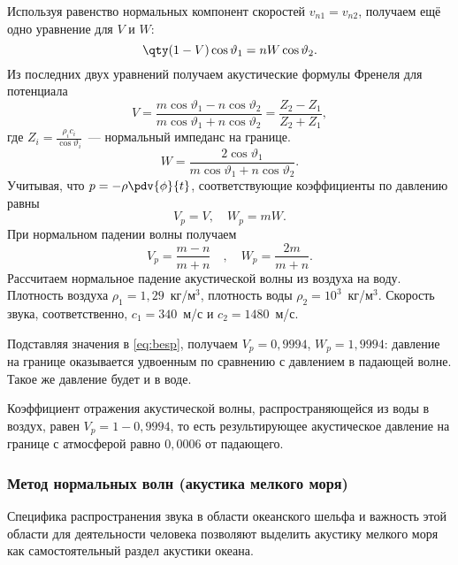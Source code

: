 Используя равенство нормальных компонент скоростей $v_{n1} = v_{n2}$, получаем ещё одно уравнение для $V$ и $W$:
\begin{equation}
\qty(1-V) \cos \vartheta_1 =nW \cos \vartheta_2.
\end{equation}
Из последних двух уравнений получаем акустические формулы Френеля для потенциала
\begin{equation}
V= \frac{m \cos \vartheta_1 -n \cos \vartheta_2 }{m \cos \vartheta_1 +n \cos \vartheta_2 } = \frac{Z_2 - Z_1}{Z_2 + Z_1},
\end{equation}
где $Z_i = \frac{\rho_i c_i}{\cos \vartheta_i }$~--- нормальный импеданс на границе.
\begin{equation}
W= \frac{2 \cos \vartheta_1 }{m \cos \vartheta_1 +n \cos \vartheta_2 }.
\end{equation}
Учитывая, что $p=-\rho \pdv{\phi}{t}$, соответствующие коэффициенты по давлению равны
\begin{equation}
V_p =V, \quad W_p =mW.
\end{equation}
При нормальном падении волны  получаем
\begin{equation}
    \label{eq:besp}
    V_p = \frac{m-n}{m+n} \quad , \quad W_p = \frac{2m}{m+n}.
\end{equation}
Рассчитаем нормальное падение акустической волны из воздуха на воду.
Плотность воздуха $ \rho_1 =1,\!29$~кг/м${}^3$, плотность воды $\rho_2 = {10}^3$~кг/м${}^3$. Скорость звука, соответственно, $c_1 =340$~м/с и $c_2 =1480$~м/с.

Подставляя значения в \eqref{eq:besp}, получаем $V_p =0,\!9994$, $W_p=1,\!9994$: давление на границе оказывается удвоенным по сравнению с давлением в падающей волне. Такое же давление будет и в воде.

Коэффициент отражения акустической волны, распространяющейся из воды в воздух, равен $V_p =1-0,\!9994$, то есть результирующее акустическое давление на границе с атмосферой равно $0,\!0006$ от падающего.

\subsubsection{Метод нормальных волн (акустика мелкого моря)}

Специфика распространения звука в области океанского шельфа и важность этой области для деятельности человека позволяют выделить акустику мелкого моря как самостоятельный раздел акустики океана.

